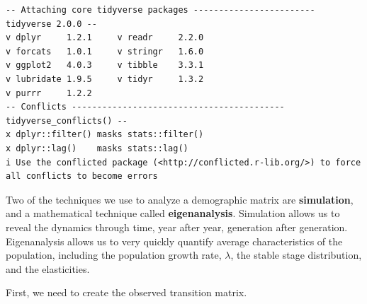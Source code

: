 \documentclass[
  letterpaper,
  DIV=11,
  numbers=noendperiod]{scrreprt}
\begin{document}
\begin{verbatim}
-- Attaching core tidyverse packages ------------------------ tidyverse 2.0.0 --
v dplyr     1.2.1     v readr     2.2.0
v forcats   1.0.1     v stringr   1.6.0
v ggplot2   4.0.3     v tibble    3.3.1
v lubridate 1.9.5     v tidyr     1.3.2
v purrr     1.2.2     
-- Conflicts ------------------------------------------ tidyverse_conflicts() --
x dplyr::filter() masks stats::filter()
x dplyr::lag()    masks stats::lag()
i Use the conflicted package (<http://conflicted.r-lib.org/>) to force all conflicts to become errors
\end{verbatim}

Two of the techniques we use to analyze a demographic matrix are
\textbf{simulation}, and a mathematical technique called
\textbf{eigenanalysis}. Simulation allows us to reveal the dynamics
through time, year after year, generation after generation.
Eigenanalysis allows us to very quickly quantify average characteristics
of the population, including the population growth rate, \(\lambda\),
the stable stage distribution, and the elasticities.

First, we need to create the observed transition matrix.
\end{document}
